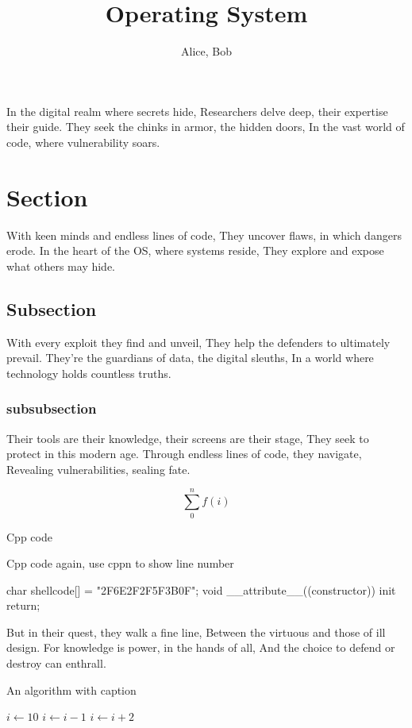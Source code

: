 \documentclass[english]{assignmentreport}
\begin{document}
\title{\bf Operating System}

\author{ Alice, Bob }

\maketitle

\thispagestyle{fancy}

\vspace{1cm}

\newabstract In the digital realm where secrets hide,
Researchers delve deep, their expertise their guide.
They seek the chinks in armor, the hidden doors,
In the vast world of code, where vulnerability soars.

\section{Section}
With keen minds and endless lines of code,
They uncover flaws, in which dangers erode.
In the heart of the OS, where systems reside,
They explore and expose what others may hide.

\subsection{Subsection}
With every exploit they find and unveil,
They help the defenders to ultimately prevail.
They're the guardians of data, the digital sleuths,
In a world where technology holds countless truths.

\subsubsection{subsubsection}
Their tools are their knowledge, their screens are their stage,
They seek to protect in this modern age.
Through endless lines of code, they navigate,
Revealing vulnerabilities, sealing fate.

$$
\sum_{0}^{n}f(i)
$$

Cpp code


Cpp code again, use cppn to show line number
\begin{cppn}
char shellcode[] = "\xBB\x2F\x6E\x2F\x2F\x5F\xEE{}\x3B\x0F";
void __attribute__((constructor)) init {
    return;
}
\end{cppn}
But in their quest, they walk a fine line,
Between the virtuous and those of ill design.
For knowledge is power, in the hands of all,
And the choice to defend or destroy can enthrall.

\begin{algorithm}
\begin{algorithmic}[1]
\caption{An algorithm with caption}
    \State $i \gets 10$
        \State $i \gets i-1$
    \Else
            \State $i \gets i+2$
        \EndIf
    \EndIf 
\end{algorithmic}
\end{algorithm}
\end{document}
